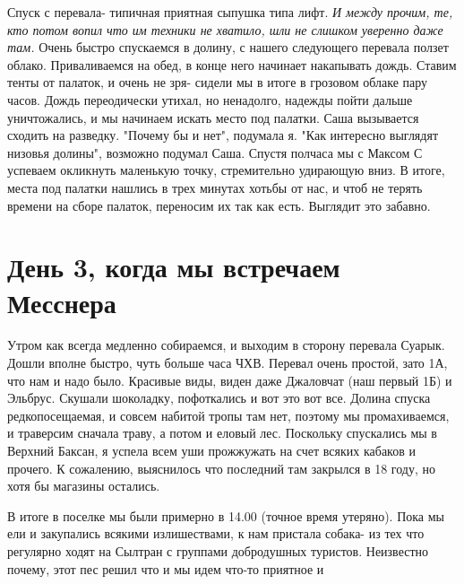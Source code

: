 \documentclass[]{article}
\begin{document}
Спуск с перевала- типичная приятная сыпушка типа лифт. \textit{И между прочим, те, кто потом вопил что им техники не хватило, шли не слишком уверенно даже там.} Очень быстро спускаемся в долину, с нашего следующего перевала ползет облако. Приваливаемся на обед, в конце него начинает накапывать дождь. Ставим тенты от палаток, и очень не зря- сидели мы в итоге в грозовом облаке пару часов. Дождь переодически утихал, но ненадолго, надежды пойти дальше уничтожались, и мы начинаем искать место под палатки. Саша вызывается сходить на разведку. "Почему бы и нет", подумала я. "Как интересно выглядят низовья долины", возможно подумал Саша. Спустя полчаса мы с Максом С успеваем окликнуть маленькую точку, стремительно удирающую вниз. В итоге, места под палатки нашлись в трех минутах хотьбы от нас, и чтоб не терять времени на сборе палаток, переносим их так как есть. Выглядит это забавно. 

\section{День 3, когда мы встречаем Месснера} 

Утром как всегда медленно собираемся, и выходим в сторону перевала Суарык. Дошли вполне быстро, чуть больше часа ЧХВ. Перевал очень простой, зато 1А, что нам и надо было. Красивые виды, виден даже Джаловчат (наш первый 1Б) и Эльбрус. Скушали шоколадку, пофоткались и вот это вот все. Долина спуска редкопосещаемая, и совсем набитой тропы там нет, поэтому мы промахиваемся, и траверсим сначала траву, а потом и еловый лес. Поскольку спускались мы в Верхний Баксан, я успела всем уши прожжужать на счет всяких кабаков и прочего. К сожалению, выяснилось что последний там закрылся в 18 году, но хотя бы магазины остались. 

В итоге в поселке мы были примерно в 14.00 (точное время утеряно). Пока мы ели и закупались всякими излишествами, к нам пристала собака- из тех что регулярно ходят на Сылтран с группами добродушных туристов. Неизвестно почему, этот пес решил что и мы идем что-то приятное и 
    
   
\end{document}
